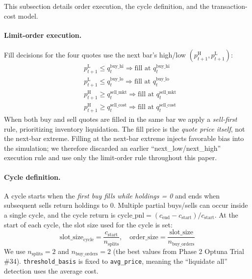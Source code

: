 \documentclass[11pt, a4paper]{article}
\begin{document}
This subsection details order execution, the cycle definition, and the
transaction-cost model.

\paragraph{Limit-order execution.}
Fill decisions for the four quotes use the next bar's high/low
$(p^{\mathrm{H}}_{t+1}, p^{\mathrm{L}}_{t+1})$:
\begin{equation}
\begin{aligned}
&p^{\mathrm{L}}_{t+1} \leq q^{\mathrm{buy\_hi}}_t  \Rightarrow
\text{fill at $q^{\mathrm{buy\_hi}}_t$} \\
&p^{\mathrm{L}}_{t+1} \leq q^{\mathrm{buy\_lo}}_t  \Rightarrow
\text{fill at $q^{\mathrm{buy\_lo}}_t$} \\
&p^{\mathrm{H}}_{t+1} \geq q^{\mathrm{sell\_mkt}}_t \Rightarrow
\text{fill at $q^{\mathrm{sell\_mkt}}_t$} \\
&p^{\mathrm{H}}_{t+1} \geq q^{\mathrm{sell\_cost}}_t \Rightarrow
\text{fill at $q^{\mathrm{sell\_cost}}_t$}
\end{aligned}
\end{equation}
When both buy and sell quotes are filled in the same bar we apply a
\emph{sell-first} rule, prioritizing inventory liquidation. The fill price is
the \emph{quote price itself}, not the next-bar extreme. Filling at the
next-bar extreme injects favorable bias into the simulation; we therefore
discarded an earlier ``next\_low/next\_high'' execution rule and use only the
limit-order rule throughout this paper.

\paragraph{Cycle definition.}
A cycle starts when the \emph{first buy fills while holdings = 0} and ends
when subsequent sells return holdings to 0. Multiple partial buys/sells can
occur inside a single cycle, and the cycle return is
$\mathrm{cycle\_pnl} = (c_{\text{end}} - c_{\text{start}}) / c_{\text{start}}$.
At the start of each cycle, the slot size used for the cycle is set:
\begin{equation}
\text{slot\_size}_{\text{cycle}} =
\frac{c_{\text{start}}}{n_{\text{splits}}}, \quad
\text{order\_size} = \frac{\text{slot\_size}}{n_{\text{buy\_orders}}}
\end{equation}
We use $n_{\text{splits}}=2$ and $n_{\text{buy\_orders}}=2$ (the best values
from Phase 2 Optuna Trial \#34). \texttt{threshold\_basis} is fixed to
\texttt{avg\_price}, meaning the ``liquidate all'' detection uses the average
cost.
\end{document}
